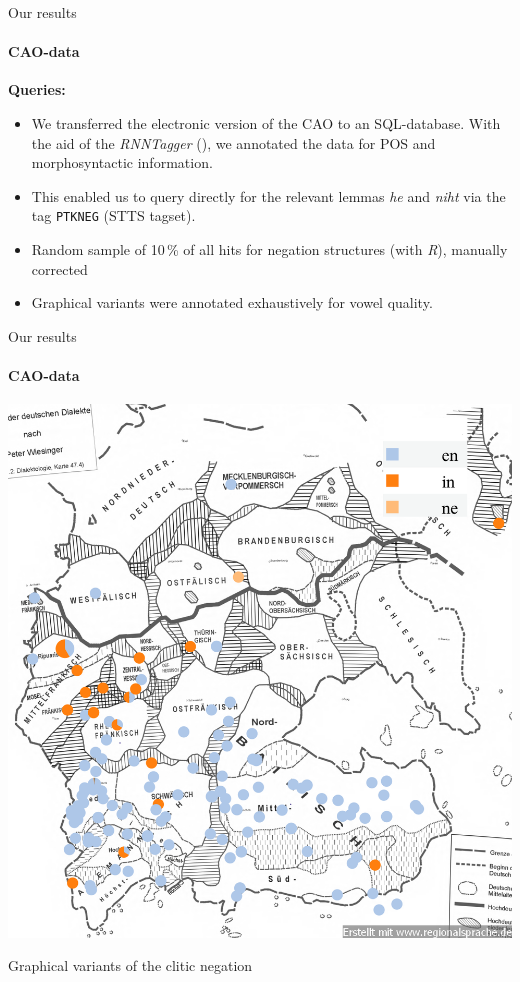 \documentclass[xcolor=table, compress, %
handout
]{beamer}
\begin{document}
\begin{frame}{Our results}
\framesubtitle{CAO-data}

\textbf{Queries:}

\begin{itemize}
\item We transferred the electronic version of the CAO to an SQL-database. With the aid of the \textit{RNNTagger} (\citealt{schmid2020}), we annotated the data for POS and morphosyntactic information.
\item This enabled us to query directly for the relevant lemmas \textit{he} and \textit{niht} via the tag \texttt{PTKNEG} (STTS tagset).
\item Random sample of 10\,\% of all hits for negation structures (with \textit{R}), manually corrected
\item Graphical variants were annotated exhaustively for vowel quality. 
\end{itemize}

\end{frame}


\begin{frame}{Our results}
\framesubtitle{CAO-data}

\begin{table}
\begin{center}
\includegraphics[scale=1]{Graphievarianten.png}
\end{center}
\caption{Graphical variants of the clitic negation}
\end{table}


\end{frame}
\end{document}
